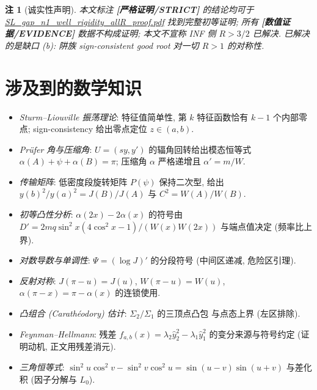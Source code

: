 \documentclass[UTF8]{ctexart}
\newtheorem{remark}[theorem]{注}
\newcommand{\STRICT}{\textbf{[严格证明/STRICT]}}
\newcommand{\EVID}{\textbf{[数值证据/EVIDENCE]}}
\begin{document}
\begin{remark}[诚实性声明]
本文标注 \STRICT{} 的结论均可于 \url{SL_gap_n1_well_rigidity_allR_proof.pdf}
找到完整初等证明; 所有 \EVID{} 数据不构成证明; 本文\emph{不}宣称 INF 侧 $R>3/2$
已解决. 已解决的是缺口 (b): 阱族 sign-consistent good root 对一切 $R>1$ 的对称性.
\end{remark}

\section{涉及到的数学知识}

\begin{itemize}
	\item \emph{Sturm--Liouville 振荡理论}: 特征值简单性, 第 $k$ 特征函数恰有
		$k-1$ 个内部零点; sign-consistency 给出零点定位 $z\in(a,b)$.
	\item \emph{Pr\"ufer 角与压缩角}: $U=(sy,y')$ 的辐角回转给出模态恒等式
		$\alpha(A)+\psi+\alpha(B)=\pi$; 压缩角 $\alpha$ 严格递增且
		$\alpha'=m/W$.
	\item \emph{传输矩阵}: 低密度段旋转矩阵 $P(\psi)$ 保持二次型, 给出
		$y(b)^2/y(a)^2=J(B)/J(A)$ 与 $C^2=W(A)/W(B)$.
	\item \emph{初等凸性分析}: $\alpha(2x)-2\alpha(x)$ 的符号由
		$D'=2mq\sin^2x(4\cos^2x-1)/(W(x)W(2x))$ 与端点值决定 (频率比上界).
	\item \emph{对数导数与单调性}: $\Psi=(\log J)'$ 的分段符号 (中间区递减,
		危险区引理).
	\item \emph{反射对称}: $J(\pi-u)=J(u)$, $W(\pi-u)=W(u)$,
		$\alpha(\pi-x)=\pi-\alpha(x)$ 的连锁使用.
	\item \emph{凸组合 (Carath\'eodory) 估计}: $\Sigma_2/\Sigma_1$ 的三顶点凸包
		与点态上界 (左区排除).
	\item \emph{Feynman--Hellmann}: 残差 $f_{a,b}(x)=\lambda_2\hat y_2^2-
		\lambda_1\hat y_1^2$ 的变分来源与符号约定 (证明动机, 正文用残差消元).
	\item \emph{三角恒等式}: $\sin^2u\cos^2v-\sin^2v\cos^2u
		=\sin(u-v)\sin(u+v)$ 与差化积 (因子分解与 $L_0$).
\end{itemize}
\end{document}
